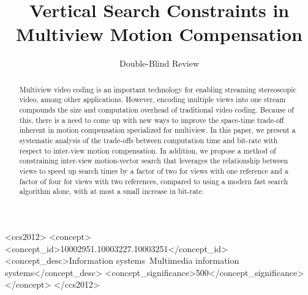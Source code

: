 \documentclass{sig-alternate-05-2015}
\begin{document}

\title{Vertical Search Constraints in Multiview Motion Compensation}
\author{
\alignauthor
Double-Blind Review
}

\maketitle

\begin{abstract}
Multiview video coding is an important technology for enabling streaming
stereoscopic video, among other applications. However, encoding multiple
views into one stream compounds the size and computation overhead of
traditional video coding. Because of this, there is a need to come up with new
ways to improve the space-time trade-off inherent in motion compensation
specialized for multiview. In this paper, we present a systematic analysis of
the trade-offs between computation time and bit-rate with respect to inter-view
motion compensation. In addition, we propose a method of constraining inter-view
motion-vector search that leverages the relationship between views to speed up
search times by a factor of two for views with one reference and a factor of
four for views with two references, compared to using a modern fast search
algorithm alone, with at most a small increase in bit-rate.
\end{abstract}

\begin{CCSXML}
<ccs2012>
<concept>
<concept_id>10002951.10003227.10003251</concept_id>
<concept_desc>Information systems~Multimedia information systems</concept_desc>
<concept_significance>500</concept_significance>
</concept>
</ccs2012>
\end{CCSXML}
\printccsdesc

\end{document}
